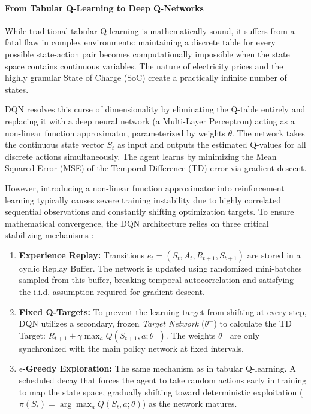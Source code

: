             \paragraph{From Tabular Q-Learning to Deep Q-Networks}
            While traditional tabular Q-learning is mathematically sound, it suffers from a fatal flaw in complex environments: maintaining a discrete table for every possible state-action pair becomes computationally impossible when the state space contains continuous variables. The nature of electricity prices and the highly granular State of Charge (SoC) create a practically infinite number of states.
                        
            DQN resolves this curse of dimensionality by eliminating the Q-table entirely and replacing it with a deep neural network (a Multi-Layer Perceptron) acting as a non-linear function approximator, parameterized by weights $\theta$. The network takes the continuous state vector $S_t$ as input and outputs the estimated Q-values for all discrete actions simultaneously. The agent learns by minimizing the Mean Squared Error (MSE) of the Temporal Difference (TD) error via gradient descent. 
            
            However, introducing a non-linear function approximator into reinforcement learning typically causes severe training instability due to highly correlated sequential observations and constantly shifting optimization targets. To ensure mathematical convergence, the DQN architecture relies on three critical stabilizing mechanisms \cite{mnih2015humanlevel}:
            \begin{enumerate}
                \item \textbf{Experience Replay:} Transitions $e_t = (S_t, A_t, R_{t+1}, S_{t+1})$ are stored in a cyclic Replay Buffer. The network is updated using randomized mini-batches sampled from this buffer, breaking temporal autocorrelation and satisfying the i.i.d. assumption required for gradient descent.
                \item \textbf{Fixed Q-Targets:} To prevent the learning target from shifting at every step, DQN utilizes a secondary, frozen \textit{Target Network} ($\theta^-$) to calculate the TD Target: $R_{t+1} + \gamma \max_{a} Q(S_{t+1}, a; \theta^-)$. The weights $\theta^-$ are only synchronized with the main policy network at fixed intervals.
                \item \textbf{$\epsilon$-Greedy Exploration:} The same mechanism as in tabular Q-learning. A scheduled decay that forces the agent to take random actions early in training to map the state space, gradually shifting toward deterministic exploitation ($\pi(S_t) = \arg\max_a Q(S_t, a; \theta)$) as the network matures.
            \end{enumerate}
            
